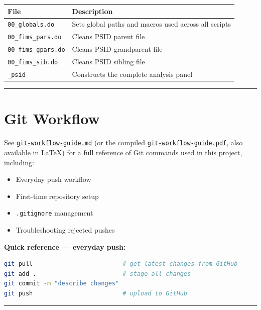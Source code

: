 \documentclass[12pt]{article}
\begin{document}
\begin{center}
\begin{tabular}{ll}
\toprule
\textbf{File} & \textbf{Description} \\
\midrule
\texttt{00\_globals.do}     & Sets global paths and macros used across all scripts \\
\texttt{00\_fims\_pars.do}  & Cleans PSID parent file \\
\texttt{00\_fims\_gpars.do} & Cleans PSID grandparent file \\
\texttt{00\_fims\_sib.do}   & Cleans PSID sibling file \\
\texttt{\_psid}             & Constructs the complete analysis panel \\
\bottomrule
\end{tabular}
\end{center}

\noindent\rule{\textwidth}{0.4pt}

\section*{Git Workflow}

See \href{git-workflow-guide.md}{\texttt{git-workflow-guide.md}} (or the compiled \href{git-workflow-guide.pdf}{\texttt{git-workflow-guide.pdf}}, also available in \LaTeX{}) for a full reference of Git commands used in this project, including:

\begin{itemize}
    \item Everyday push workflow
    \item First-time repository setup
    \item \texttt{.gitignore} management
    \item Troubleshooting rejected pushes
\end{itemize}

\textbf{Quick reference --- everyday push:}

\begin{lstlisting}[language=bash]
git pull                         # get latest changes from GitHub
git add .                        # stage all changes
git commit -m "describe changes"
git push                         # upload to GitHub
\end{lstlisting}

\noindent\rule{\textwidth}{0.4pt}
\end{document}
